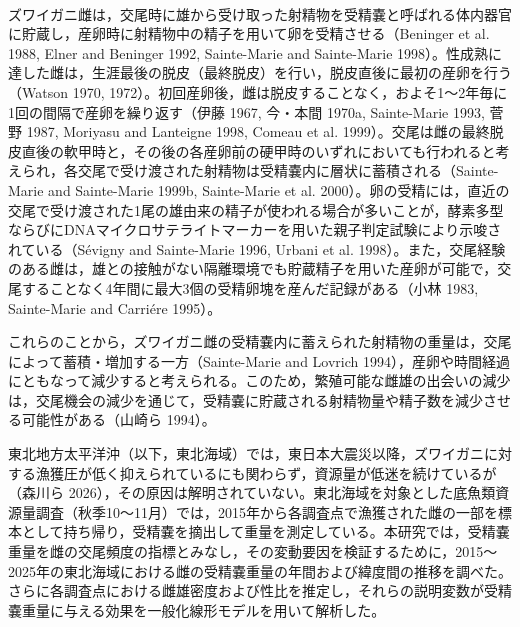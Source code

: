 \begin{center}
     \\
\end{center}

\begin{center}
\end{center}

\vspace{1\baselineskip}

ズワイガニ雌は，交尾時に雄から受け取った射精物を受精嚢と呼ばれる体内器官に貯蔵し，産卵時に射精物中の精子を用いて卵を受精させる（Beninger et al. 1988, Elner and Beninger 1992, Sainte-Marie and Sainte-Marie 1998）。性成熟に達した雌は，生涯最後の脱皮（最終脱皮）を行い，脱皮直後に最初の産卵を行う（Watson 1970, 1972）。初回産卵後，雌は脱皮することなく，およそ1～2年毎に1回の間隔で産卵を繰り返す（伊藤 1967, 今・本間 1970a, Sainte-Marie 1993, 菅野 1987, Moriyasu and Lanteigne 1998, Comeau et al. 1999）。交尾は雌の最終脱皮直後の軟甲時と，その後の各産卵前の硬甲時のいずれにおいても行われると考えられ，各交尾で受け渡された射精物は受精嚢内に層状に蓄積される（Sainte-Marie and Sainte-Marie 1999b, Sainte-Marie et al. 2000）。卵の受精には，直近の交尾で受け渡された1尾の雄由来の精子が使われる場合が多いことが，酵素多型ならびにDNAマイクロサテライトマーカーを用いた親子判定試験により示唆されている（S\'{e}vigny and Sainte-Marie 1996, Urbani et al. 1998）。また，交尾経験のある雌は，雄との接触がない隔離環境でも貯蔵精子を用いた産卵が可能で，交尾することなく4年間に最大3個の受精卵塊を産んだ記録がある（小林 1983, Sainte-Marie and Carri\'{e}re 1995）。

これらのことから，ズワイガニ雌の受精嚢内に蓄えられた射精物の重量は，交尾によって蓄積・増加する一方（Sainte-Marie and Lovrich 1994），産卵や時間経過にともなって減少すると考えられる。このため，繁殖可能な雌雄の出会いの減少は，交尾機会の減少を通じて，受精嚢に貯蔵される射精物量や精子数を減少させる可能性がある（山崎ら 1994）。

東北地方太平洋沖（以下，東北海域）では，東日本大震災以降，ズワイガニに対する漁獲圧が低く抑えられているにも関わらず，資源量が低迷を続けているが（森川ら 2026），その原因は解明されていない。東北海域を対象とした底魚類資源量調査（秋季10～11月）では，2015年から各調査点で漁獲された雌の一部を標本として持ち帰り，受精嚢を摘出して重量を測定している。本研究では，受精嚢重量を雌の交尾頻度の指標とみなし，その変動要因を検証するために，2015～2025年の東北海域における雌の受精嚢重量の年間および緯度間の推移を調べた。さらに各調査点における雌雄密度および性比を推定し，それらの説明変数が受精嚢重量に与える効果を一般化線形モデルを用いて解析した。


